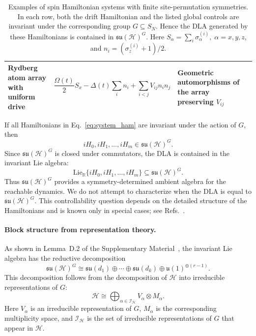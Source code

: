 \documentclass[10pt,twocolumn,superscriptaddress,aps,amsmath,amssymb,citeautoscript,floatfix,prx,longbibliography]{revtex4-2}
\newcounter{alg}
\theoremstyle{plain}
\theoremstyle{plain}
\theoremstyle{plain}
\theoremstyle{plain}
\theoremstyle{plain}
\theoremstyle{plain}
\begin{document}
\begin{table}[t]
\begin{tabular}{llll}
\parbox[t]{0.19\textwidth}{Rydberg atom array with uniform drive}
&
\parbox[t]{0.38\textwidth}{
\[
\frac{\Omega(t)}{2}S_x
-\Delta(t)\sum_i n_i
+\sum_{i<j}V_{ij}n_in_j
\]
}
&
\parbox[t]{0.22\textwidth}{
Geometric automorphisms of the array preserving \(V_{ij}\)
}
&
\parbox[t]{0.13\textwidth}{
\cite{Browaeys2020,Daley2022}
}
\\

\hline
\end{tabular}
\caption{
Examples of spin Hamiltonian systems with finite site-permutation symmetries. In each row, both the drift Hamiltonian and the listed global controls are invariant under the corresponding group \(G\subseteq S_N\). Hence the DLA generated by these Hamiltonians is contained in
\(\mathfrak{su}(\mathcal H)^G\). Here $S_{\alpha}=\sum_i \sigma_{\alpha}^{(i)}, \; \alpha=x, y, z$, and $n_i=\left(\sigma_z^{(i)}+1\right) / 2$.
}
\end{table}

If all Hamiltonians in Eq.~\eqref{eq:system_ham} are invariant under the action of $G$, then
$$
iH_0,iH_1,\ldots,iH_m
\in
\mathfrak{su}(\mathcal H)^G .
$$
Since $\mathfrak{su}(\mathcal H)^G$ is closed under commutators, the DLA is contained in the invariant Lie algebra:
$$
\mathrm{Lie}_{\mathbb R}
\{iH_0,iH_1,\ldots,iH_m\}
\subseteq
\mathfrak{su}(\mathcal H)^G .
$$
Thus $\mathfrak{su}(\mathcal H)^G$ provides a symmetry-determined ambient algebra for the reachable dynamics. We do not attempt to characterize when the DLA is equal to $\mathfrak{su}(\mathcal H)^G$. This controllability question depends on the detailed structure of the Hamiltonians and is known only in special cases; see Refs.~\cite{Albertini2020, Kokcu2024, Wiersema2024}.

\paragraph{Block structure from representation theory.}

As shown in Lemma~D.2 of the Supplementary Material~\cite{SuppMat}, the invariant Lie algebra has the reductive decomposition
\begin{equation}\label{eq:inv_alg_decomp}
\mathfrak{su}(\mathcal H)^G
\cong
\mathfrak{su}(d_1)
\oplus
\cdots
\oplus
\mathfrak{su}(d_k)
\oplus
\mathfrak{u}(1)^{\oplus(r-1)} .
\end{equation}
This decomposition follows from the decomposition of $\mathcal H$ into irreducible representations of $G$:
\begin{equation}\label{eq:H_G_irrep_decomp}
\mathcal H
\cong
\bigoplus_{\alpha\in\mathcal I_{\mathcal H}}
V_\alpha\otimes M_\alpha .
\end{equation}
Here $V_\alpha$ is an irreducible representation of $G$, $M_\alpha$ is the corresponding multiplicity space, and $\mathcal I_{\mathcal H}$ is the set of irreducible representations of $G$ that appear in $\mathcal H$.
\end{document}
